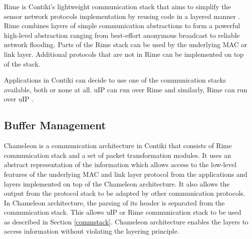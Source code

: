 Rime is Contiki's lightweight communication stack that aims to simplify the sensor network protocols implementation by reusing code in a layered manner \cite{rimeposter}. Rime combines layers of simple communication abstractions to form a powerful high-level abstraction ranging from best-effort anonymous broadcast to reliable network flooding. Parts of the Rime stack can be used by the underlying MAC or link layer. Additional protocols that are not in Rime can be implemented on top of the stack.

Applications in Contiki can decide to use one of the communication stacks available, both or none at all. uIP can run over Rime and similarly, Rime can run over uIP \cite{contikitutorial}. 





\subsection{Buffer Management}
\label{bufmgmt}
Chameleon \cite{rime} is a communication architecture in Contiki that consists of Rime communication stack and a set of packet transformation modules. It uses an abstract representation of the information which allows access to the low-level features of the underlying MAC and link layer protocol from the applications and layers implemented on top of the Chameleon architecture. It also allows the output from the protocol stack to be adapted by other communication protocols. In Chameleon architecture, the parsing of its header is separated from the communication stack. This allows uIP or Rime communication stack to be used as described in Section \ref{commstack}. Chameleon architecture enables the layers to access information without violating the layering principle. 

